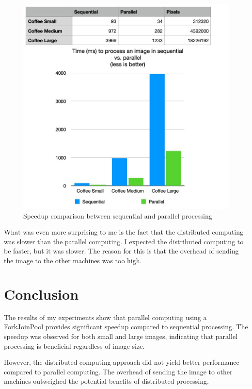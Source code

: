 \documentclass{article}
\begin{document}
\begin{multicols}{2}
    \begin{figure}[H]
        \centering
        \includegraphics[width=\linewidth]{img/coffee_speedup.jpg}
        \caption{Speedup comparison between sequential and parallel processing}
        \label{fig:speedup}
    \end{figure}

    What was even more surprising to me is the fact that the distributed computing was slower than the parallel computing. I expected the distributed computing to be faster, but it was slower. The reason for this is that the overhead of sending the image to the other machines was too high.

    \section{Conclusion}

    The results of my experiments show that parallel computing using a ForkJoinPool provides significant speedup compared to sequential processing. The speedup was observed for both small and large images, indicating that parallel processing is beneficial regardless of image size.

    However, the distributed computing approach did not yield better performance compared to parallel computing. The overhead of sending the image to other machines outweighed the potential benefits of distributed processing.

\end{multicols}

\printbibliography[heading=bibintoc, title={References}]

\end{document}
